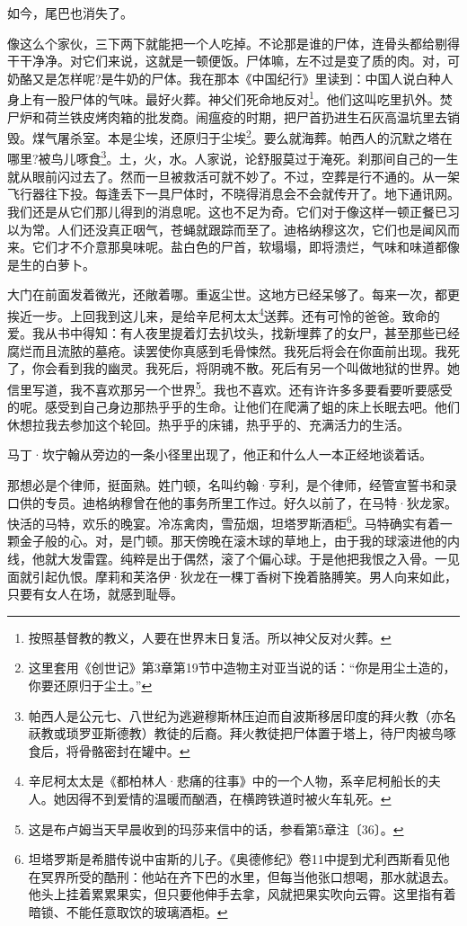 \par 如今，尾巴也消失了。
\par 像这么个家伙，三下两下就能把一个人吃掉。不论那是谁的尸体，连骨头都给剔得干干净净。对它们来说，这就是一顿便饭。尸体嘛，左不过是变了质的肉。对，可奶酪又是怎样呢?是牛奶的尸体。我在那本《中国纪行》里读到：中国人说白种人身上有一股尸体的气味。最好火葬。神父们死命地反对\footnote{按照基督教的教义，人要在世界末日复活。所以神父反对火葬。}。他们这叫吃里扒外。焚尸炉和荷兰铁皮烤肉箱的批发商。闹瘟疫的时期，把尸首扔进生石灰高温坑里去销毁。煤气屠杀室。本是尘埃，还原归于尘埃\footnote{这里套用《创世记》第3章第19节中造物主对亚当说的话：“你是用尘土造的，你要还原归于尘土。”}。要么就海葬。帕西人的沉默之塔在哪里?被鸟儿啄食\footnote{帕西人是公元七、八世纪为逃避穆斯林压迫而自波斯移居印度的拜火教（亦名祆教或琐罗亚斯德教）教徒的后裔。拜火教徒把尸体置于塔上，待尸肉被鸟啄食后，将骨骼密封在罐中。}。土，火，水。人家说，论舒服莫过于淹死。刹那间自己的一生就从眼前闪过去了。然而一旦被救活可就不妙了。不过，空葬是行不通的。从一架飞行器往下投。每逢丢下一具尸体时，不晓得消息会不会就传开了。地下通讯网。我们还是从它们那儿得到的消息呢。这也不足为奇。它们对于像这样一顿正餐已习以为常。人们还没真正咽气，苍蝇就跟踪而至了。迪格纳穆这次，它们也是闻风而来。它们才不介意那臭味呢。盐白色的尸首，软塌塌，即将溃烂，气味和味道都像是生的白萝卜。
\par 大门在前面发着微光，还敞着哪。重返尘世。这地方已经呆够了。每来一次，都更挨近一步。上回我到这儿来，是给辛尼柯太太\footnote{辛尼柯太太是《都柏林人·悲痛的往事》中的一个人物，系辛尼柯船长的夫人。她因得不到爱情的温暖而酗酒，在横跨铁道时被火车轧死。}送葬。还有可怜的爸爸。致命的爱。我从书中得知：有人夜里提着灯去扒坟头，找新埋葬了的女尸，甚至那些已经腐烂而且流脓的墓疮。读罢使你真感到毛骨悚然。我死后将会在你面前出现。我死了，你会看到我的幽灵。我死后，将阴魂不散。死后有另一个叫做地狱的世界。她信里写道，我不喜欢那另一个世界\footnote{这是布卢姆当天早晨收到的玛莎来信中的话，参看第5章注〔36〕。}。我也不喜欢。还有许许多多要看要听要感受的呢。感受到自己身边那热乎乎的生命。让他们在爬满了蛆的床上长眠去吧。他们休想拉我去参加这个轮回。热乎乎的床铺，热乎乎的、充满活力的生活。
\par 马丁·坎宁翰从旁边的一条小径里出现了，他正和什么人一本正经地谈着话。
\par 那想必是个律师，挺面熟。姓门顿，名叫约翰·亨利，是个律师，经管宣誓书和录口供的专员。迪格纳穆曾在他的事务所里工作过。好久以前了，在马特·狄龙家。快活的马特，欢乐的晚宴。冷冻禽肉，雪茄烟，坦塔罗斯酒柜\footnote{坦塔罗斯是希腊传说中宙斯的儿子。《奥德修纪》卷11中提到尤利西斯看见他在冥界所受的酷刑：他站在齐下巴的水里，但每当他张口想喝，那水就退去。他头上挂着累累果实，但只要他伸手去拿，风就把果实吹向云霄。这里指有着暗锁、不能任意取饮的玻璃酒柜。}。马特确实有着一颗金子般的心。对，是门顿。那天傍晚在滚木球的草地上，由于我的球滚进他的内线，他就大发雷霆。纯粹是出于偶然，滚了个偏心球。于是他把我恨之入骨。一见面就引起仇恨。摩莉和芙洛伊·狄龙在一棵丁香树下挽着胳膊笑。男人向来如此，只要有女人在场，就感到耻辱。
